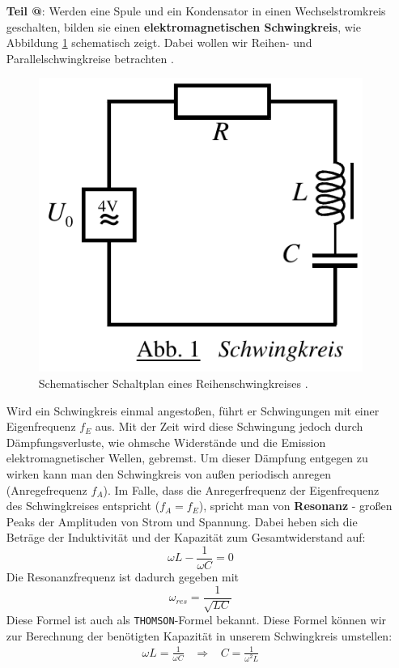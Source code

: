 \documentclass[10pt,a4paper]{article}
\makeatletter
\newcommand*{\rom}[1]{\expandafter\@slowromancap\romannumeral #1@}
\makeatother
\begin{document}
\begin{flushleft}
\begin{itemize}
\item[\textbf{Teil \rom{3}}:] \hypertarget{theo-res}{Werden} eine Spule und ein Kondensator in einen Wechselstromkreis geschalten, bilden sie einen \textbf{elektromagnetischen Schwingkreis}, wie Abbildung \ref{fig:schemschwing} schematisch zeigt. Dabei wollen wir Reihen- und Parallelschwingkreise betrachten \cite{vers10}.

\begin{figure}[H]
\centering
\includegraphics[scale=0.4]{schema_schwing}
\caption{Schematischer Schaltplan eines Reihenschwingkreises \cite{vers10}.}
\label{fig:schemschwing}
\end{figure}

Wird ein Schwingkreis einmal angestoßen, führt er Schwingungen mit einer Eigenfrequenz $f_E$ aus. Mit der Zeit wird diese Schwingung jedoch durch Dämpfungsverluste, wie ohmsche Widerstände und die Emission elektromagnetischer Wellen, gebremst. Um dieser Dämpfung entgegen zu wirken kann man den Schwingkreis von außen periodisch anregen (Anregefrequenz $f_A$). Im Falle, dass die Anregerfrequenz der Eigenfrequenz des Schwingkreises entspricht ($f_A = f_E$), spricht man von \textbf{Resonanz} - großen Peaks der Amplituden von Strom und Spannung. Dabei heben sich die Beträge der Induktivität und der Kapazität zum Gesamtwiderstand auf:
\begin{equation}\label{eq:reso}
\omega L - \frac{1}{\omega C} = 0
\end{equation}
Die Resonanzfrequenz ist dadurch gegeben mit
\begin{equation}\label{eq:res_freq}
\omega_{res} = \frac{1}{\sqrt{LC}}
\end{equation}
Diese Formel ist auch als \texttt{THOMSON}-Formel bekannt. Diese Formel können wir zur Berechnung der benötigten Kapazität in unserem Schwingkreis umstellen:
\begin{align}\label{eq:berechn_kapa}
\omega L = \frac{1}{\omega C} \hspace{10pt}\Rightarrow \hspace{10pt} C = \frac{1}{\omega^2 L}
\end{align}


\end{itemize}
\end{flushleft}
\end{document}
